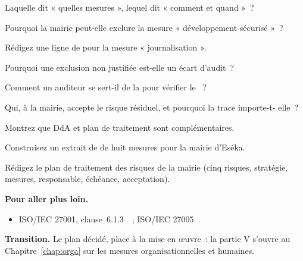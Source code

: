 \begin{boxexo}[title={\ding{45}\quad Exercice~14.2. DdA ou plan \niveaubase}]
Laquelle dit « quelles mesures », lequel dit « comment et quand »~?
\end{boxexo}

\begin{boxexo}[title={\ding{45}\quad Exercice~14.3. Exclusion \niveaubase}]
Pourquoi la mairie peut-elle exclure la mesure « développement sécurisé »~?
\end{boxexo}

\begin{boxexo}[title={\ding{45}\quad Exercice~14.4. Une ligne \niveaumoyen}]
Rédigez une ligne de  pour la mesure « journalisation ».
\end{boxexo}

\begin{boxexo}[title={\ding{45}\quad Exercice~14.5. Exclusion non justifiée \niveaumoyen}]
Pourquoi une exclusion non justifiée est-elle un écart d'audit~?
\end{boxexo}

\begin{boxexo}[title={\ding{45}\quad Exercice~14.6. Lire à rebours \niveaumoyen}]
Comment un auditeur se sert-il de la  pour vérifier le ~?
\end{boxexo}

\begin{boxexo}[title={\ding{45}\quad Exercice~14.7. Acceptation \niveaumoyen}]
Qui, à la mairie, accepte le risque résiduel, et pourquoi la trace importe-t-
elle~?
\end{boxexo}

\begin{boxexo}[title={\ding{45}\quad Exercice~14.8. Complémentarité \niveaumoyen}]
Montrez que DdA et plan de traitement sont complémentaires.
\end{boxexo}

\begin{boxexo}[title={\ding{45}\quad Exercice~14.9. DdA de la mairie \niveauexpert}]
Construisez un extrait de  de huit mesures pour la mairie d'Eséka.
\end{boxexo}

\begin{boxexo}[title={\ding{45}\quad Exercice~14.10. Plan complet \niveauexpert}]
Rédigez le plan de traitement des risques de la mairie (cinq risques, stratégie,
mesures, responsable, échéance, acceptation).
\end{boxexo}

\bigskip

\begin{boxinfo}
\textbf{Pour aller plus loin.}
\begin{itemize}
    \item ISO/IEC 27001, clause~6.1.3~\cite{iso27001}~; ISO/IEC 27005~\cite{iso27005}.
\end{itemize}
\end{boxinfo}

\begin{boxinfo}
\textbf{Transition.} Le plan décidé, place à la mise en \oe uvre~: la partie V
s'ouvre au Chapitre~\ref{chap:orga} sur les mesures organisationnelles et
humaines.
\end{boxinfo}
